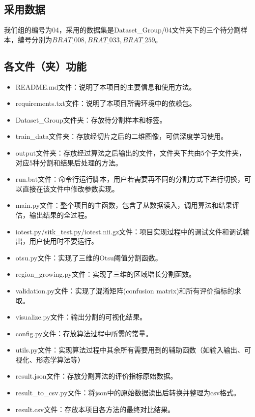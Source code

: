 \documentclass[UTF8]{ctexart}
\begin{document}
\subsection{采用数据}
我们组的编号为04，采用的数据集是Dataset\_Group/04文件夹下的三个待分割样本，编号分别为$BRAT\_008,BRAT\_033,BRAT\_259$。


\subsection{各文件（夹）功能}
\begin{itemize}
    \item README.md文件：说明了本项目的主要信息和使用方法。
    \item requirements.txt文件：说明了本项目所需环境中的依赖包。
    \item Dataset\_Group文件夹：存放待分割样本和标签。
    \item train\_data文件夹：存放经切片之后的二维图像，可供深度学习使用。
    \item output文件夹：存放经过算法之后输出的文件，文件夹下共由5个子文件夹，对应5种分割和结果后处理的方法。
    \item run.bat文件：命令行运行脚本，用户若需要再不同的分割方式下进行切换，可以直接在该文件中修改参数实现。
    \item main.py文件：整个项目的主函数，包含了从数据读入，调用算法和结果评估，输出结果的全过程。
    \item iotest.py/sitk\_test.py/iotest.nii.gz文件：项目实现过程中的调试文件和调试输出，用户使用时不要运行。
    \item otsu.py文件：实现了三维的Otsu阈值分割函数。
    \item region\_growing.py文件：实现了三维的区域增长分割函数。
    \item validation.py文件：实现了混淆矩阵(confusion matrix)和所有评价指标的求取。
    \item visualize.py文件：输出分割的可视化结果。
    \item config.py文件：存放算法过程中所需的常量。
    \item utils.py文件：实现算法过程中其余所有需要用到的辅助函数（如输入输出、可视化、形态学算法等）
    \item result.json文件：存放分割算法的评价指标原始数据。
    \item result\_to\_csv.py文件：将json中的原始数据读出后转换并整理为csv格式。
    \item result.csv文件：存放本项目各方法的最终对比结果。
\end{itemize}
\end{document}
